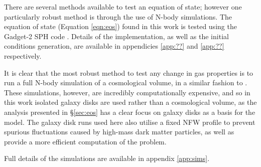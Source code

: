 There are several methods available to test an equation of state; however one particularly robust method is through the use of N-body simulations.
The equation of state (Equation \ref{eqn:eos}) found in this work is tested using the Gadget-2 SPH code \citep{springel_cosmological_2005}.
Details of the implementation, as well as the initial conditions generation, are available in appendicies \ref{app:??} and \ref{app:??} respectively.

It is clear that the most robust method to test any change in gas properties is to run a full N-body simulation of a cosmological volume, in a similar fashion to \citet{schaye2015, volksberger2014}.
These simulations, however, are incredibly computationally expensive, and so in this work isolated galaxy disks are used rather than a cosmological volume, as the analysis presented in \S \ref{sec:eos} has a clear focus on galaxy disks as a basis for the model.
The galaxy disk runs used here also utilise a fixed NFW profile \citep{coe_dark_2010, navarro_structure_1996} to prevent spurious fluctuations caused by high-mass dark matter particles, as well as provide a more efficient computation of the problem.

Full details of the simulations are available in appendix \ref{app:sims}.
